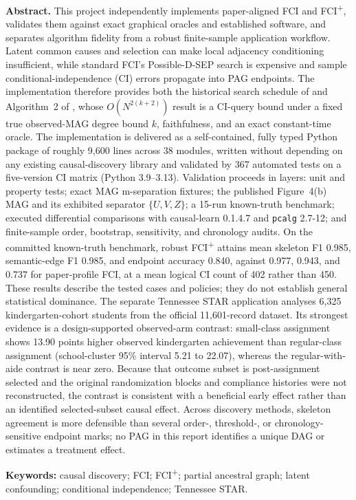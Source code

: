 \documentclass[11pt,a4paper]{article}
\newcommand{\FCIplus}{FCI\textsuperscript{+}}
\newcommand{\code}[1]{\texttt{#1}}
\begin{document}
\begin{center}
\begin{minipage}{0.94\textwidth}
{\small
\textbf{\color{ReportNavy}Abstract.}
This project independently implements paper-aligned FCI and \FCIplus{},
validates them against exact graphical oracles and established software, and
separates algorithm fidelity from a robust finite-sample application workflow.
Latent common causes and selection can make local adjacency conditioning
insufficient, while standard FCI's Possible-D-SEP search is expensive and
sample conditional-independence (CI) errors propagate into PAG endpoints. The
implementation therefore provides both the historical search schedule of
\citet{spirtes2000causation} and Algorithm~2 of \citet{claassen2013learning},
whose \(O(N^{2(k+2)})\) result is a CI-query bound under a fixed true
observed-MAG degree bound \(k\), faithfulness, and an exact constant-time
oracle. The implementation is delivered as a self-contained, fully typed
Python package of roughly 9,600 lines across 38 modules, written without
depending on any existing causal-discovery library and validated by 367
automated tests on a five-version CI matrix (Python 3.9--3.13). Validation
proceeds in layers: unit and property tests; exact MAG m-separation fixtures;
the published Figure~4(b) MAG and its exhibited separator \(\{U,V,Z\}\); a
15-run known-truth benchmark; executed differential comparisons with
causal-learn 0.1.4.7 and \code{pcalg} 2.7-12; and finite-sample order,
bootstrap, sensitivity, and chronology audits. On the
committed known-truth benchmark, robust \FCIplus{} attains mean skeleton F1
0.985, semantic-edge F1 0.985, and endpoint accuracy 0.840, against 0.977,
0.943, and 0.737 for paper-profile FCI, at a mean logical CI count of 402
rather than 450. These results describe the tested cases and policies; they do
not establish general statistical dominance. The separate Tennessee STAR
application analyses 6,325 kindergarten-cohort students from the official
11,601-record dataset. Its strongest evidence is a design-supported observed-arm
contrast: small-class assignment shows 13.90 points higher observed
kindergarten achievement than regular-class assignment (school-cluster 95\%
interval 5.21 to 22.07), whereas the regular-with-aide contrast is near zero.
Because that outcome subset is post-assignment selected and the original
randomization blocks and compliance histories were not reconstructed, the
contrast is consistent with a beneficial early effect rather than an identified
selected-subset causal effect. Across discovery methods, skeleton agreement is
more defensible than several order-, threshold-, or chronology-sensitive
endpoint marks; no PAG in this report identifies a unique DAG or estimates a
treatment effect.

\vspace{0.5ex}
\textbf{\color{ReportNavy}Keywords:} causal discovery; FCI; \FCIplus{};
partial ancestral graph; latent confounding; conditional independence;
Tennessee STAR.
\par}
\end{minipage}
\end{center}
\end{document}
